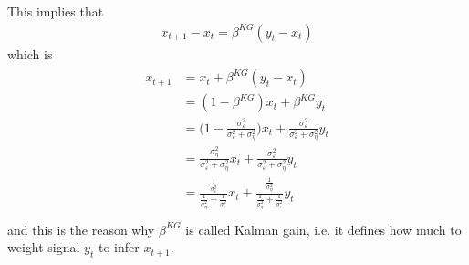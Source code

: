 \documentclass[14pt]{article}
\begin{document}
{\begin{enumerate}
	This implies that
	\begin{eqnarray}
	x_{t+1} -  x_{t} = \beta^{KG} (y_t - x_{t})
	\end{eqnarray}
	which is
		\begin{eqnarray}
			\begin{aligned}
	x_{t+1} &= x_{t} +  \beta^{KG} (y_t - x_{t}) \\
	&= (1 - \beta^{KG})  x_{t} +  \beta^{KG}  y_t \\
	&= \bigg(1 - \frac{\sigma^2_{\varepsilon}}{\sigma^2_{\varepsilon} + \sigma^2_{\eta}}  \bigg)  x_{t} +  \frac{\sigma^2_{\varepsilon}}{\sigma^2_{\varepsilon} + \sigma^2_{\eta}}   y_t \\
		&= \frac{\sigma^2_{\eta}}{\sigma^2_{\varepsilon} + \sigma^2_{\eta}}  x_{t} +  \frac{\sigma^2_{\varepsilon}}{\sigma^2_{\varepsilon} + \sigma^2_{\eta}}   y_t \\
				&= \frac{\frac{1}{\sigma^2_{\varepsilon}}}{\frac{1}{\sigma^2_{\eta}} + \frac{1}{\sigma^2_{\varepsilon}}}  x_{t} +  \frac{\frac{1}{\sigma^2_{\eta}}}{\frac{1}{\sigma^2_{\eta}} + \frac{1}{\sigma^2_{\varepsilon}}}   y_t \\
		\end{aligned}
	\end{eqnarray}
	and this is the reason why $\beta^{KG}$ is called Kalman gain, i.e. it defines how much to weight signal $y_t$ to infer $x_{t+1}$.
	

\end{enumerate}}
\end{document}
